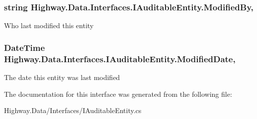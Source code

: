 \hypertarget{interface_highway_1_1_data_1_1_interfaces_1_1_i_auditable_entity_afaaaaf4ceb8c53fbc36fb4193dbc1132}{
\subsubsection[{Modified\-By}]{\setlength{\rightskip}{0pt plus 5cm}string Highway.\-Data.\-Interfaces.\-I\-Auditable\-Entity.\-Modified\-By\hspace{0.3cm}{\ttfamily [get]}, {\ttfamily [set]}}}\label{interface_highway_1_1_data_1_1_interfaces_1_1_i_auditable_entity_afaaaaf4ceb8c53fbc36fb4193dbc1132}


Who last modified this entity 

\hypertarget{interface_highway_1_1_data_1_1_interfaces_1_1_i_auditable_entity_a031bc6b61314bcd2c7f08aee90b461ff}{
\subsubsection[{Modified\-Date}]{\setlength{\rightskip}{0pt plus 5cm}Date\-Time Highway.\-Data.\-Interfaces.\-I\-Auditable\-Entity.\-Modified\-Date\hspace{0.3cm}{\ttfamily [get]}, {\ttfamily [set]}}}\label{interface_highway_1_1_data_1_1_interfaces_1_1_i_auditable_entity_a031bc6b61314bcd2c7f08aee90b461ff}


The date this entity was last modified 



The documentation for this interface was generated from the following file\-:\begin{DoxyCompactItemize}
\item 
Highway.\-Data/\-Interfaces/I\-Auditable\-Entity.\-cs\end{DoxyCompactItemize}
